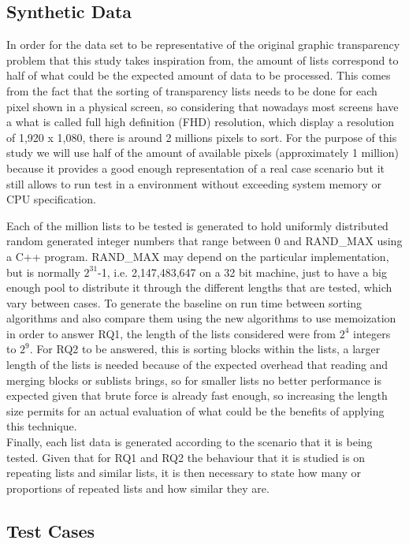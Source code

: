 \documentclass[a4paper,12pt]{article}
\begin{document}
\subsection{Synthetic Data}

In order for the data set to be representative of the original graphic transparency problem that this study takes inspiration from, the amount of lists correspond to half of what could be the expected amount of data to be processed. This comes from the fact that the sorting of transparency lists needs to be done for each pixel shown in a physical screen, so considering that nowadays most screens have a what is called full high definition (FHD) resolution, which display a resolution of 1,920 x 1,080, there is around 2 millions pixels to sort. For the purpose of this study  we will use half of the amount of available pixels (approximately 1 million) because it provides a good enough representation of a real case scenario but it still allows to run test in a environment without exceeding system memory or CPU specification.

Each of the million lists to be tested is generated to hold uniformly distributed random generated integer numbers that range between 0 and RAND\_MAX using a C++ program. RAND\_MAX may depend on the particular implementation, but is normally  $2^{31}$-1, i.e. 2,147,483,647 on a 32 bit machine, just  to have a big enough pool to distribute it through the different lengths that are tested, which vary between cases. To generate the baseline on run time between sorting algorithms and also compare them using the new algorithms to use memoization in order to answer RQ1, the length of the lists considered were from $2^4$ integers to $2^9$. For RQ2 to be answered, this is sorting blocks within the lists, a larger length of the lists is needed because of the expected overhead that reading and merging blocks or sublists brings, so for smaller lists no better performance is expected given that brute force is already fast enough, so increasing the length size permits for an actual evaluation of what could be the benefits of applying this technique.\\

Finally, each list data is generated according to the scenario that it is being tested. Given that for RQ1 and RQ2 the behaviour that it is studied is on repeating lists and similar lists, it is then necessary to state how many or proportions of repeated lists and how similar they are. 

\subsection{Test Cases}
\end{document}
